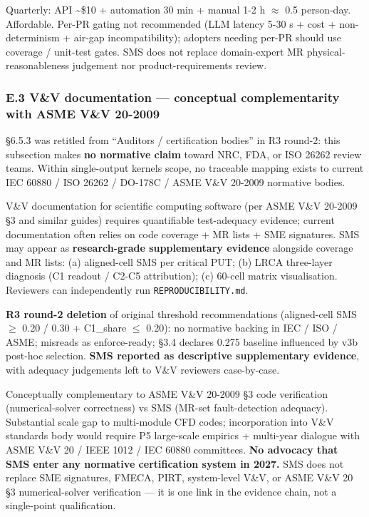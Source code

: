 \documentclass[review,12pt,authoryear]{elsarticle}
\begin{document}
Quarterly: API \textasciitilde\$10 + automation 30 min + manual 1-2 h $\approx$
0.5 person-day. Affordable. Per-PR gating not recommended (LLM latency
5-30 s + cost + non-determinism + air-gap incompatibility); adopters
needing per-PR should use coverage / unit-test gates. SMS does not
replace domain-expert MR physical-reasonableness judgement nor
product-requirements review.

\subsubsection{E.3 V\&V documentation --- conceptual complementarity
with ASME V\&V
20-2009}\label{e.3-vv-documentation-conceptual-complementarity-with-asme-vv-20-2009}

§6.5.3 was retitled from ``Auditors / certification bodies'' in R3
round-2: this subsection makes \textbf{no normative claim} toward NRC,
FDA, or ISO 26262 review teams. Within single-output kernels scope, no
traceable mapping exists to current IEC 60880 / ISO 26262 / DO-178C /
ASME V\&V 20-2009 normative bodies.

V\&V documentation for scientific computing software (per ASME V\&V
20-2009 §3 and similar guides) requires quantifiable test-adequacy
evidence; current documentation often relies on code coverage + MR lists
+ SME signatures. SMS may appear as \textbf{research-grade supplementary
evidence} alongside coverage and MR lists: (a) aligned-cell SMS per
critical PUT; (b) LRCA three-layer diagnosis (C1 readout / C2-C5
attribution); (c) 60-cell matrix visualisation. Reviewers can
independently run \texttt{REPRODUCIBILITY.md}.

\textbf{R3 round-2 deletion} of original threshold recommendations
(aligned-cell SMS $\geq$ 0.20 / 0.30 + C1\_share $\leq$ 0.20): no normative
backing in IEC / ISO / ASME; misreads as enforce-ready; §3.4 declares
0.275 baseline influenced by v3b post-hoc selection. \textbf{SMS
reported as descriptive supplementary evidence}, with adequacy
judgements left to V\&V reviewers case-by-case.

Conceptually complementary to ASME V\&V 20-2009 §3 code verification
(numerical-solver correctness) vs SMS (MR-set fault-detection adequacy).
Substantial scale gap to multi-module CFD codes; incorporation into V\&V
standards body would require P5 large-scale empirics + multi-year
dialogue with ASME V\&V 20 / IEEE 1012 / IEC 60880 committees.
\textbf{No advocacy that SMS enter any normative certification system in
2027.} SMS does not replace SME signatures, FMECA, PIRT, system-level
V\&V, or ASME V\&V 20 §3 numerical-solver verification --- it is one
link in the evidence chain, not a single-point qualification.
\end{document}
